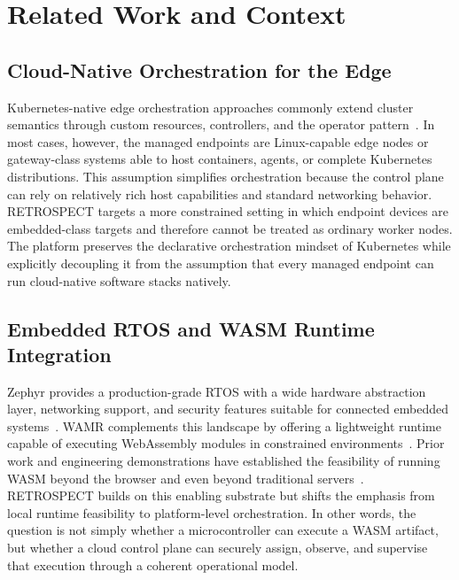 \section{Related Work and Context}

\subsection{Cloud-Native Orchestration for the Edge}
Kubernetes-native edge orchestration approaches commonly extend cluster semantics through custom resources, controllers, and the operator pattern~\cite{kubernetes_operators}. In most cases, however, the managed endpoints are Linux-capable edge nodes or gateway-class systems able to host containers, agents, or complete Kubernetes distributions. This assumption simplifies orchestration because the control plane can rely on relatively rich host capabilities and standard networking behavior. RETROSPECT targets a more constrained setting in which endpoint devices are embedded-class targets and therefore cannot be treated as ordinary worker nodes. The platform preserves the declarative orchestration mindset of Kubernetes while explicitly decoupling it from the assumption that every managed endpoint can run cloud-native software stacks natively.

\subsection{Embedded RTOS and WASM Runtime Integration}
Zephyr provides a production-grade RTOS with a wide hardware abstraction layer, networking support, and security features suitable for connected embedded systems~\cite{zephyr}. WAMR complements this landscape by offering a lightweight runtime capable of executing WebAssembly modules in constrained environments~\cite{wamr}. Prior work and engineering demonstrations have established the feasibility of running WASM beyond the browser and even beyond traditional servers~\cite{haas_wasm}. RETROSPECT builds on this enabling substrate but shifts the emphasis from local runtime feasibility to platform-level orchestration. In other words, the question is not simply whether a microcontroller can execute a WASM artifact, but whether a cloud control plane can securely assign, observe, and supervise that execution through a coherent operational model.

